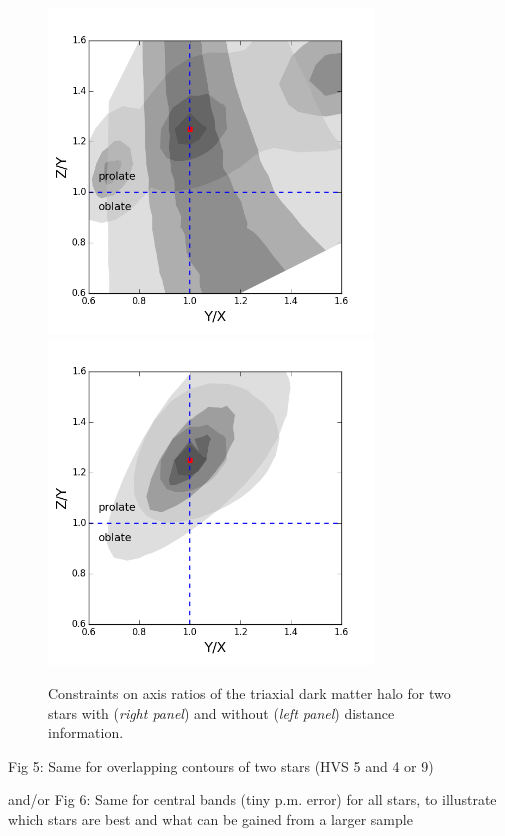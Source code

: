\documentclass[iop]{emulateapj}
\begin{document}
\begin{figure}[t]
  \begin{minipage}{\hsize}
    \centering
    \includegraphics[width=3.4in]{axis_hvs5_9_nod.png}
    \includegraphics[width=3.4in]{axis_hvs5_9_d20.png}
  \end{minipage}
  \vspace{-0.2cm}
\caption{\small Constraints on axis ratios of the triaxial dark matter halo for two stars with ({\it right panel}) and without ({\it left panel}) distance information.}
  \vspace{0.3cm}
  \label{fig:axis_hvs5_9}
\end{figure}

Fig 5: Same for overlapping contours of two stars (HVS 5 and 4 or 9)

and/or Fig 6: Same for central bands (tiny p.m. error) for all stars, to illustrate which stars are best and what can be gained from a larger sample
\end{document}
